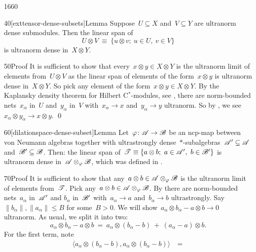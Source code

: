 \begin{parsec}{1660}
\begin{point}{40}[exttensor-dense-subsets]{Lemma}
Suppose~$U \subseteq X$ and~$V \subseteq Y$
    are ultranorm dense submodules.
Then the linear span of
\begin{equation*}
    U \otimes V \ \equiv\  \{ u \otimes v;\  u \in U,\ v \in V\}
\end{equation*}
is ultranorm dense in~$X \otimes Y$.
\begin{point}{50}{Proof}%
It is sufficient to show that every~$x \otimes y \in X \otimes Y$
    is the ultranorm limit of elements from~$U \otimes V$
    as the linear span of elements of the form~$x \otimes y$
    is ultranorm dense in~$X \otimes Y$.
So pick any element of the form~$x \otimes y \in X \otimes Y$.
By the Kaplansky density theorem for Hilbert C$^*$-modules,
 see ,
    there are norm-bounded nets~$x_\alpha$ in~$U$
    and~$y_\alpha$ in~$V$
    with~$x_\alpha \to x$ and~$y_\alpha \to y$ ultranorm.
So by ,
    we see~$x_\alpha \otimes y_\alpha \to x \otimes y$. \qed
\end{point}
\end{point}
\begin{point}{60}[dilationspace-dense-subset]{Lemma}%
Let~$\varphi \colon \mathscr{A} \to \mathscr{B}$ be an ncp-map between von Neumann algebras
    together with ultrastrongly
    dense~$*$-subalgebras~$\mathscr{A}' \subseteq \mathscr{A}$
        and~$\mathscr{B}' \subseteq \mathscr{B}$.
Then: the linear span
    of~$ \mathscr{T}  \equiv \{ a \otimes b;\ a \in \mathscr{A}', \ b\in \mathscr{B}'\}$
is ultranorm dense in~$\mathscr{A} \otimes_\varphi \mathscr{B}$,
which was defined in  .
\begin{point}{70}{Proof}%
It is sufficient to show that any~$a\otimes b \in \mathscr{A} \otimes_\varphi \mathscr{B}$
    is the ultranorm limit of elements from~$\mathscr{T}$.
    Pick any~$a\otimes b\in \mathscr{A} \otimes_\varphi \mathscr{B}$.
By 
    there are norm-bounded nets~$a_\alpha$ in~$\mathscr{A}'$ and
    $b_\alpha$ in~$\mathscr{B}'$
    with~$a_\alpha \to a$ and~$b_\alpha \to b$ ultrastrongly.
Say~$\|b_\alpha \|, \|a_\alpha\| \leq B$ for some~$B > 0$.
We will show~$a_\alpha \otimes b_\alpha - a\otimes b \to 0$ ultranorm.
As usual, we split it into two:
\begin{equation*}
a_\alpha \otimes b_\alpha - a \otimes b
\ = \ a_\alpha \otimes(b_\alpha -b )\  +\  (a_\alpha - a) \otimes b.
\end{equation*}
For the first term, note
\begin{align*}
    \langle a_\alpha \otimes (b_\alpha  - b),
    a_\alpha \otimes (b_\alpha  - b) \rangle
    & \ = \ 

\end{align*}
\end{point}
\end{point}
\end{parsec}
